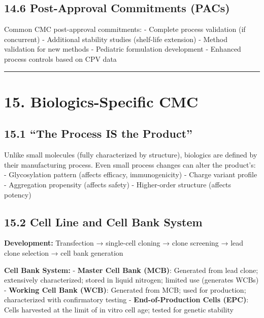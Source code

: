 \documentclass[
  11pt,
  a4paper,
]{report}
\begin{document}
\hypertarget{post-approval-commitments-pacs}{%
\subsection{14.6 Post-Approval Commitments
(PACs)}\label{post-approval-commitments-pacs}}

Common CMC post-approval commitments: - Complete process validation (if
concurrent) - Additional stability studies (shelf-life extension) -
Method validation for new methods - Pediatric formulation development -
Enhanced process controls based on CPV data

\begin{center}\rule{0.5\linewidth}{0.5pt}\end{center}

\hypertarget{biologics-specific-cmc}{%
\section{15. Biologics-Specific CMC}\label{biologics-specific-cmc}}

\hypertarget{the-process-is-the-product}{%
\subsection{15.1 ``The Process IS the
Product''}\label{the-process-is-the-product}}

Unlike small molecules (fully characterized by structure), biologics are
defined by their manufacturing process. Even small process changes can
alter the product's: - Glycosylation pattern (affects efficacy,
immunogenicity) - Charge variant profile - Aggregation propensity
(affects safety) - Higher-order structure (affects potency)

\hypertarget{cell-line-and-cell-bank-system}{%
\subsection{15.2 Cell Line and Cell Bank
System}\label{cell-line-and-cell-bank-system}}

\textbf{Development:} Transfection → single-cell cloning → clone
screening → lead clone selection → cell bank generation

\textbf{Cell Bank System:} - \textbf{Master Cell Bank (MCB)}: Generated
from lead clone; extensively characterized; stored in liquid nitrogen;
limited use (generates WCBs) - \textbf{Working Cell Bank (WCB)}:
Generated from MCB; used for production; characterized with confirmatory
testing - \textbf{End-of-Production Cells (EPC)}: Cells harvested at the
limit of in vitro cell age; tested for genetic stability
\end{document}
